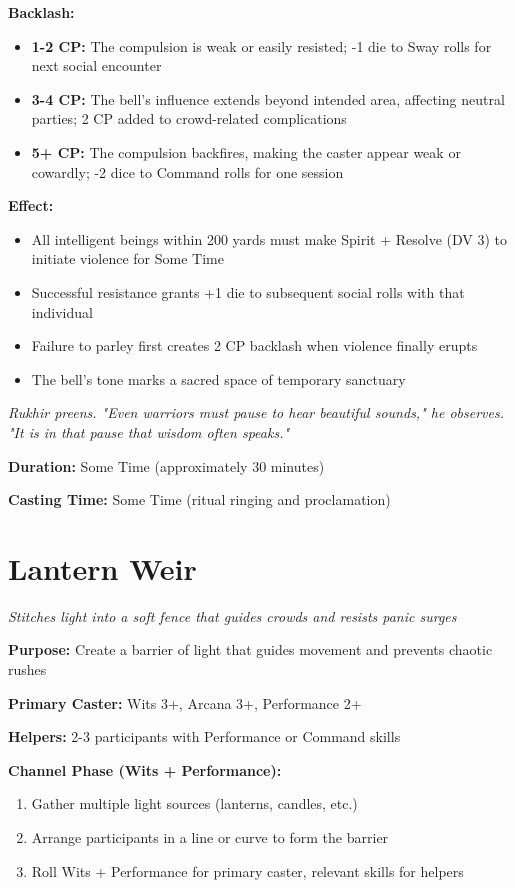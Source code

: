 \documentclass[12pt,twoside]{book}
\newcommand{\shadow}[1]{\textit{#1}}
\begin{document}
\textbf{Backlash:}
\begin{itemize}
\item \textbf{1-2 CP:} The compulsion is weak or easily resisted; -1 die to Sway rolls for next social encounter
\item \textbf{3-4 CP:} The bell's influence extends beyond intended area, affecting neutral parties; 2 CP added to crowd-related complications
\item \textbf{5+ CP:} The compulsion backfires, making the caster appear weak or cowardly; -2 dice to Command rolls for one session
\end{itemize}

\textbf{Effect:}
\begin{itemize}
\item All intelligent beings within 200 yards must make Spirit + Resolve (DV 3) to initiate violence for Some Time
\item Successful resistance grants +1 die to subsequent social rolls with that individual
\item Failure to parley first creates 2 CP backlash when violence finally erupts
\item The bell's tone marks a sacred space of temporary sanctuary
\end{itemize}

\shadow{Rukhir preens. "Even warriors must pause to hear beautiful sounds," he observes. "It is in that pause that wisdom often speaks."}

\textbf{Duration:} Some Time (approximately 30 minutes)

\textbf{Casting Time:} Some Time (ritual ringing and proclamation)

\section*{Lantern Weir}
\textit{Stitches light into a soft fence that guides crowds and resists panic surges}

\textbf{Purpose:} Create a barrier of light that guides movement and prevents chaotic rushes

\textbf{Primary Caster:} Wits 3+, Arcana 3+, Performance 2+

\textbf{Helpers:} 2-3 participants with Performance or Command skills

\textbf{Channel Phase (Wits + Performance):}
\begin{enumerate}
\item Gather multiple light sources (lanterns, candles, etc.)
\item Arrange participants in a line or curve to form the barrier
\item Roll Wits + Performance for primary caster, relevant skills for helpers
\end{enumerate}
\end{document}
